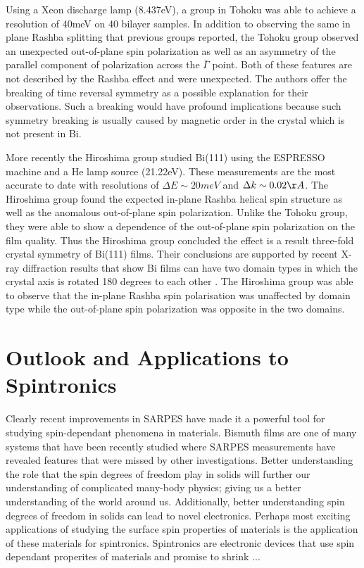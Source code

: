 \documentclass[12pt]{article}
\begin{document}
Using a Xeon discharge lamp (8.437eV), a group in Tohoku was able to achieve a resolution of 40meV on 40 bilayer samples\cite{Takayama}.
In addition to observing the same in plane Rashba splitting that previous groups reported, the Tohoku group observed an unexpected out-of-plane spin polarization as well as an asymmetry of the parallel component of polarization across the $\bar{\Gamma}$ point.
Both of these features are not described by the Rashba effect and were unexpected.
The authors offer the breaking of time reversal symmetry as a possible explanation for their observations.
Such a breaking would have profound implications because such symmetry breaking is usually caused by magnetic order in the crystal which is not present in Bi.

More recently the Hiroshima group studied Bi(111) using the ESPRESSO machine and a He lamp source (21.22eV)\cite{Miyahara}.
These measurements are the most accurate to date with resolutions of $\Delta E\sim20meV$ and $\Delta k\sim0.02\AA$.
The Hiroshima group found the expected in-plane Rashba helical spin structure as well as the anomalous out-of-plane spin polarization.
Unlike the Tohoku group, they were able to show a dependence of the out-of-plane spin polarization on the film quality.
Thus the Hiroshima group concluded the effect is a result three-fold crystal symmetry of Bi(111) films.
Their conclusions are supported by recent X-ray diffraction results that show Bi films can have two domain types in which the crystal axis is rotated 180 degrees to each other \cite{Shirasawa}.
The Hiroshima group was able to observe that the in-plane Rashba spin polarisation was unaffected by domain type while the out-of-plane spin polarization was opposite in the two domains.

\section{Outlook and Applications to Spintronics}
Clearly recent improvements in SARPES have made it a powerful tool for studying spin-dependant phenomena in materials.
Bismuth films are one of many systems that have been recently studied where SARPES measurements have revealed features that were missed by other investigations.
Better understanding the role that the spin degrees of freedom play in solids will further our understanding of complicated many-body physics; giving us a better understanding of the world around us.
Additionally, better understanding spin degrees of freedom in solids can lead to novel electronics.
Perhaps most exciting applications of studying the surface spin properties of materials is the application of these materials for spintronics.
Spintronics are electronic devices that use spin dependant properites of materials and promise to shrink ...

\printbibliography
\end{document}
